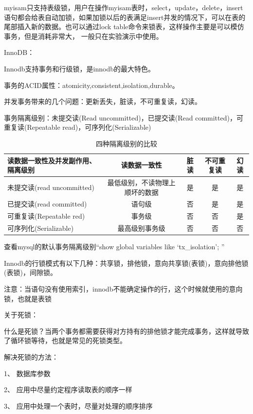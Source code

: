 \documentclass[UTF8]{ctexart}
\begin{document}
myisam只支持表级锁，用户在操作myisam表时，select，update，delete，insert语句都会给表自动加锁，如果加锁以后的表满足insert并发的情况下，可以在表的尾部插入新的数据。也可以通过lock table命令来锁表，这样操作主要是可以模仿事务，但是消耗非常大，
一般只在实验演示中使用。

InnoDB：

Innodb支持事务和行级锁，是innodb的最大特色。

事务的ACID属性：atomicity,consistent,isolation,durable。

并发事务带来的几个问题：更新丢失，脏读，不可重复读，幻读。

事务隔离级别：未提交读(Read uncommitted)，已提交读(Read committed)，可重复读(Repeatable read)，可序列化(Serializable)

\begin{table}[]
    \caption{四种隔离级别的比较}
    \vspace{20pt}
    \centering
    \begin{tabular}{|l|c|c|c|c|}
        \hline
        读数据一致性及并发副作用、隔离级别&读数据一致性&脏读&不可重复读&幻读\\
        \hline
		未提交读(read uncommitted)&最低级别，不读物理上顺坏的数据&是&是&是\\
		已提交读(read committed)	&语句级&否&是&是\\
		可重复读(Repeatable red)	&事务级&否&否&是\\
		可序列化(Serializable)	&最高级别事务级&否&否&否\\
        \hline       
    \end{tabular}
    \label{bs02}
\end{table}

查看mysql的默认事务隔离级别“show global variables like ‘tx\_isolation’; ”

Innodb的行锁模式有以下几种：共享锁，排他锁，意向共享锁(表锁)，意向排他锁(表锁)，间隙锁。

注意：当语句没有使用索引，innodb不能确定操作的行，这个时候就使用的意向锁，也就是表锁

关于死锁：

什么是死锁？当两个事务都需要获得对方持有的排他锁才能完成事务，这样就导致了循环锁等待，也就是常见的死锁类型。

解决死锁的方法：

1、  数据库参数

2、  应用中尽量约定程序读取表的顺序一样

3、  应用中处理一个表时，尽量对处理的顺序排序
\end{document}

